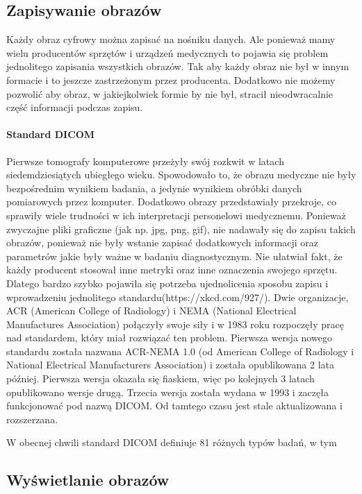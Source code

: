 \subsection{Zapisywanie obrazów}

Każdy obraz cyfrowy można zapisać na nośniku danych.
Ale ponieważ mamy wielu producentów sprzętów i urządzeń medycznych to pojawia się problem jednolitego zapisania wszystkich obrazów.
Tak aby każdy obraz nie był w innym formacie i to jeszcze zastrzeżonym przez producenta.
Dodatkowo nie możemy pozwolić aby obraz, w jakiejkolwiek formie by nie był, stracił nieodwracalnie część informacji podczas zapisu.

\paragraph{Standard DICOM}


Pierwsze tomografy komputerowe przeżyły swój rozkwit w latach siedemdziesiątych ubiegłego wieku.
Spowodowało to, że obrazu medyczne nie były bezpośrednim wynikiem badania, a jedynie wynikiem obróbki danych pomiarowych przez komputer.
Dodatkowo obrazy przedstawiały przekroje, co sprawiły wiele trudności w ich interpretacji personelowi medycznemu.
Ponieważ zwyczajne pliki graficzne (jak np. jpg, png, gif), nie nadawały się do zapisu takich obrazów, ponieważ nie były wstanie zapisać dodatkowych informacji oraz parametrów jakie były ważne w badaniu diagnostycznym.
Nie ułatwiał fakt, że każdy producent stosował inne metryki oraz inne oznaczenia swojego sprzętu.
Dlatego bardzo szybko pojawiła się potrzeba ujednolicenia sposobu zapisu i wprowadzeniu jednolitego standardu(https://xkcd.com/927/).
Dwie organizacje, ACR (American College of Radiology) i NEMA (National Electrical Manufactures Association) połączyły swoje siły i w 1983 roku rozpoczęły pracę nad standardem, który miał rozwiązać ten problem.
Pierwsza wersja nowego standardu została nazwana ACR-NEMA 1.0 (od American College of Radiology i National Electrical Manufacturers Association) i została opublikowana 2 lata później.
Pierwsza wersja okazała się fiaskiem, więc po kolejnych 3 latach opublikowano wersje drugą.
Trzecia wersja została wydana w 1993 i zaczęła funkcjonować pod nazwą DICOM. Od tamtego czasu jest stale aktualizowana i rozszerzana.

W obecnej chwili standard DICOM definiuje 81 różnych typów badań, w tym

\subsection{Wyświetlanie obrazów}

